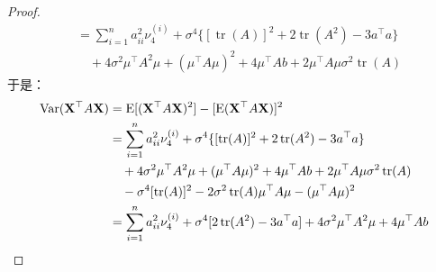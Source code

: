\begin{proof}
\begin{align*}
		&=\sum_{i=1}^{n}a_{ii}^2\nu_4^{(i)}+\sigma^4\{[\operatorname{tr}(A)]^2+2\operatorname{tr}(A^2)-3a^{\top}a\} \\
		&\quad+4\sigma^2\mu^{\top}A^2\mu+(\mu^{\top}A\mu)^2+4\mu^{\top}Ab+2\mu^{\top}A\mu\sigma^2\operatorname{tr}(A)
	\end{align*}
	于是：
	\begin{align*}
		\operatorname{Var}(\mathbf{X}^{\top}A\mathbf{X})
		&=\operatorname{E}[(\mathbf{X}^{\top}A\mathbf{X})^2]-[\operatorname{E}(\mathbf{X}^{\top}A\mathbf{X})]^2 \\
		&=\sum_{i=1}^{n}a_{ii}^2\nu_4^{(i)}+\sigma^4\{[\operatorname{tr}(A)]^2+2\operatorname{tr}(A^2)-3a^{\top}a\} \\
		&\quad+4\sigma^2\mu^{\top}A^2\mu+(\mu^{\top}A\mu)^2+4\mu^{\top}Ab+2\mu^{\top}A\mu\sigma^2\operatorname{tr}(A) \\
		&\quad-\sigma^4[\operatorname{tr}(A)]^2-2\sigma^2\operatorname{tr}(A)\mu^{\top}A\mu-(\mu^{\top}A\mu)^2 \\
		&=\sum_{i=1}^{n}a_{ii}^2\nu_4^{(i)}+\sigma^4[2\operatorname{tr}(A^2)-3a^{\top}a]+4\sigma^2\mu^{\top}A^2\mu+4\mu^{\top}Ab\qedhere
	\end{align*}
\end{proof}

